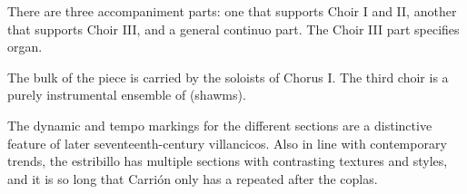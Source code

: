 \begin{notesources}
    \begin{source}
    \end{source}
\end{notesources}

There are three accompaniment parts: one that supports Choir I and
II, another that supports Choir III, and a general continuo part.
The Choir III part specifies organ.

The bulk of the piece is carried by the soloists of Chorus I.
The third choir is a purely instrumental ensemble of 
(shawms).

The dynamic and tempo markings for the different sections are a distinctive
feature of later seventeenth-century villancicos.
Also in line with contemporary trends, the estribillo has multiple sections
with contrasting textures and styles, and it is so long that Carrión only has
a  repeated after the coplas.

\endinput
